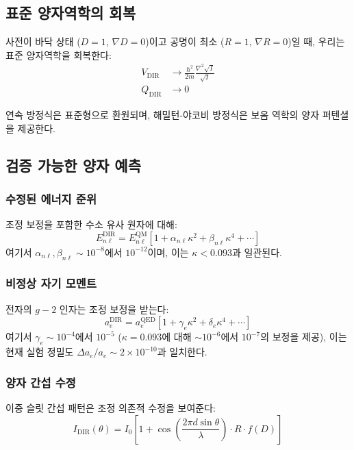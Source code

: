\documentclass[11pt,a4paper]{article}
\begin{document}
\subsection{표준 양자역학의 회복}

사전이 바닥 상태 ($D = 1$, $\nabla D = 0$)이고 공명이 최소 ($R = 1$, $\nabla R = 0$)일 때, 우리는 표준 양자역학을 회복한다:
\begin{align}
V_{\text{DIR}} &\to \frac{\hbar^2}{2m} \frac{\nabla^2 \sqrt{I}}{\sqrt{I}} \\
Q_{\text{DIR}} &\to 0
\end{align}

연속 방정식은 표준형으로 환원되며, 해밀턴-야코비 방정식은 보옴 역학의 양자 퍼텐셜을 제공한다.

\subsection{검증 가능한 양자 예측}

\subsubsection{수정된 에너지 준위}
조정 보정을 포함한 수소 유사 원자에 대해:
\begin{equation}
E_{n\ell}^{\text{DIR}} = E_{n\ell}^{\text{QM}} \left[ 1 + \alpha_{n\ell} \kappa^2 + \beta_{n\ell} \kappa^4 + \cdots \right]
\end{equation}
여기서 $\alpha_{n\ell}, \beta_{n\ell} \sim 10^{-8}$에서 $10^{-12}$이며, 이는 $\kappa < 0.093$과 일관된다.

\subsubsection{비정상 자기 모멘트}
전자의 $g-2$ 인자는 조정 보정을 받는다:
\begin{equation}
a_e^{\text{DIR}} = a_e^{\text{QED}} \left[ 1 + \gamma_e \kappa^2 + \delta_e \kappa^4 + \cdots \right]
\end{equation}
여기서 $\gamma_e \sim 10^{-4}$에서 $10^{-5}$ ($\kappa=0.093$에 대해 $\sim 10^{-6}$에서 $10^{-7}$의 보정을 제공), 이는 현재 실험 정밀도 $\Delta a_e/a_e \sim 2\times10^{-10}$과 일치한다.

\subsubsection{양자 간섭 수정}
이중 슬릿 간섭 패턴은 조정 의존적 수정을 보여준다:
\begin{equation}
I_{\text{DIR}}(\theta) = I_0 \left[ 1 + \cos\left( \frac{2\pi d \sin\theta}{\lambda} \right) \cdot R \cdot f(D) \right]
\end{equation}
\end{document}
